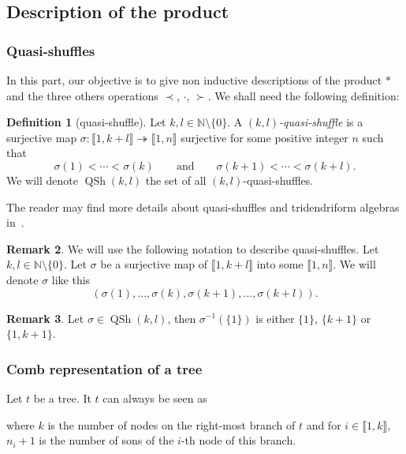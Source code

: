 \documentclass[pdftex]{sigma}
\numberwithin{equation}{section}
\theoremstyle{definition}
\newtheorem{defi}{Definition}[section]
\newtheorem{Rq}[defi]{Remark}
\theoremstyle{plain}
\newcommand{\IEM}[2]{\llbracket #1,#2 \rrbracket}
\newcommand{\N}{\mathbb{N}}
\DeclareMathOperator{\batc}{QSh}
\begin{document}
\subsection{Description of the product}
\subsubsection{Quasi-shuffles}
In this part, our objective is to give non inductive descriptions of the product $*$ and the three others operations $\prec$, $\cdot$, $\succ$. We shall need the following definition:
\begin{defi}[quasi-shuffle]
	Let $k,l\in\N\setminus \{0\}$. A \emph{$(k,l)$-quasi-shuffle} is a surjective map $\sigma\colon\IEM{1}{k+l}\twoheadrightarrow\IEM{1}{n}$ surjective for some positive integer $n$ such that
	\[
	\sigma(1)<\cdots<\sigma(k) \qquad \text{and} \qquad \sigma(k+1)<\cdots<\sigma(k+l).
	\]
	We will denote $\batc(k,l)$ the set of all $(k,l)$-quasi-shuffles.
\end{defi}

The reader may find more details about quasi-shuffles and tridendriform algebras in~\cite{Bruhat}.

\begin{Rq}
	We will use the following notation to describe quasi-shuffles. Let $k,l\in\N\setminus\{0\}$. Let $\sigma$ be a surjective map of $\IEM{1}{k+l}$ into some $\IEM{1}{n}$. We will denote $\sigma$ like this
	\[
	(\sigma(1),\dots,\sigma(k),\sigma(k+1),\dots,\sigma(k+l)).
	\]
\end{Rq}
\begin{Rq}
	Let $\sigma\in\batc(k,l)$, then $\sigma^{-1}(\{1\})$ is either $\{1\}$, $\{k+1\}$ or $\{1,k+1\}$.
\end{Rq}

\subsubsection{Comb representation of a tree}

Let $t$ be a tree. It $t$ can always be seen as
\begin{center}
\end{center}
where $k$ is the number of nodes on the right-most branch of $t$ and for $i\in\IEM{1}{k}$, $n_i+1$ is the number of sons of the $i$-th node of this branch.
\end{document}
